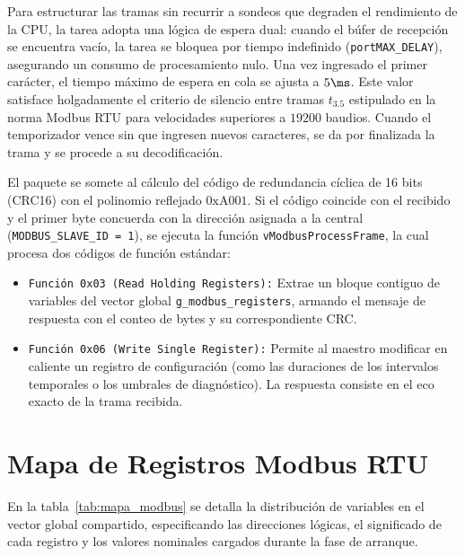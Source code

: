Para estructurar las tramas sin recurrir a sondeos que degraden el rendimiento de la CPU, la tarea adopta una lógica
de espera dual: cuando el búfer de recepción se encuentra vacío, la tarea se bloquea por tiempo indefinido
(\texttt{portMAX\_DELAY}), asegurando un consumo de procesamiento nulo. Una vez ingresado el primer carácter, el tiempo
máximo de espera en cola se ajusta a $5\ms$. Este valor satisface holgadamente el criterio de silencio entre tramas
$t_{3.5}$ estipulado en la norma Modbus RTU para velocidades superiores a $19200$ baudios. Cuando el temporizador
vence sin que ingresen nuevos caracteres, se da por finalizada la trama y se procede a su decodificación.

El paquete se somete al cálculo del código de redundancia cíclica de 16 bits (CRC16) con el polinomio reflejado
$0\mathrm{xA001}$. Si el código coincide con el recibido y el primer byte concuerda con la dirección asignada a la
central (\texttt{MODBUS\_SLAVE\_ID = 1}), se ejecuta la función \texttt{vModbusProcessFrame}, la cual procesa dos
códigos de función estándar:
\begin{itemize}
  \item \texttt{Función 0x03 (Read Holding Registers):} Extrae un bloque contiguo de variables del vector global
  \texttt{g\_modbus\_registers}, armando el mensaje de respuesta con el conteo de bytes y su correspondiente CRC.
  \item \texttt{Función 0x06 (Write Single Register):} Permite al maestro modificar en caliente un registro de
  configuración (como las duraciones de los intervalos temporales o los umbrales de diagnóstico). La respuesta
  consiste en el eco exacto de la trama recibida.
\end{itemize}

\section{Mapa de Registros Modbus RTU}
\label{sec:mapa_modbus}

En la tabla~\ref{tab:mapa_modbus} se detalla la distribución de variables en el vector global compartido,
especificando las direcciones lógicas, el significado de cada registro y los valores nominales cargados durante la
fase de arranque.

